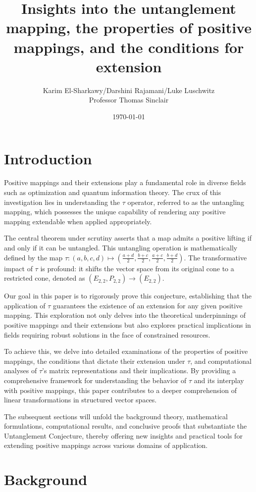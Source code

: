 \documentclass[11pt]{amsart}
\title[Positive Liftable Mappings]{Insights into the untanglement mapping, the properties of positive mappings, and the conditions for extension}
\author[El-Sharkawy, Rajamani, Luschwitz, Sinclair]{Karim El-Sharkawy/Darshini Rajamani/Luke Luschwitz \\ Professor Thomas Sinclair}
\date{\today}
\theoremstyle{definition}
\begin{document}
\maketitle

\section{Introduction}
Positive mappings and their extensions play a fundamental role in diverse fields such as optimization and quantum information theory. The crux of this investigation lies in understanding the $\tau$ operator, referred to as the untangling mapping, which possesses the unique capability of rendering any positive mapping extendable when applied appropriately.

The central theorem under scrutiny asserts that a map admits a positive lifting if and only if it can be untangled. This untangling operation is mathematically defined by the map $\tau: (a, b, c, d) \mapsto \left( \frac{a+d}{2}, \frac{b+c}{2}, \frac{a+c}{2}, \frac{b+d}{2} \right)$. The transformative impact of $\tau$ is profound: it shifts the vector space from its original cone to a restricted cone, denoted as $(E_{2,2}, P_{2,2}) \to (E_{2,2})$.

Our goal in this paper is to rigorously prove this conjecture, establishing that the application of $\tau$ guarantees the existence of an extension for any given positive mapping. This exploration not only delves into the theoretical underpinnings of positive mappings and their extensions but also explores practical implications in fields requiring robust solutions in the face of constrained resources.

To achieve this, we delve into detailed examinations of the properties of positive mappings, the conditions that dictate their extension under $\tau$, and computational analyses of $\tau$’s matrix representations and their implications. By providing a comprehensive framework for understanding the behavior of $\tau$ and its interplay with positive mappings, this paper contributes to a deeper comprehension of linear transformations in structured vector spaces.

The subsequent sections will unfold the background theory, mathematical formulations, computational results, and conclusive proofs that substantiate the Untanglement Conjecture, thereby offering new insights and practical tools for extending positive mappings across various domains of application.

\section{Background}
\end{document}
